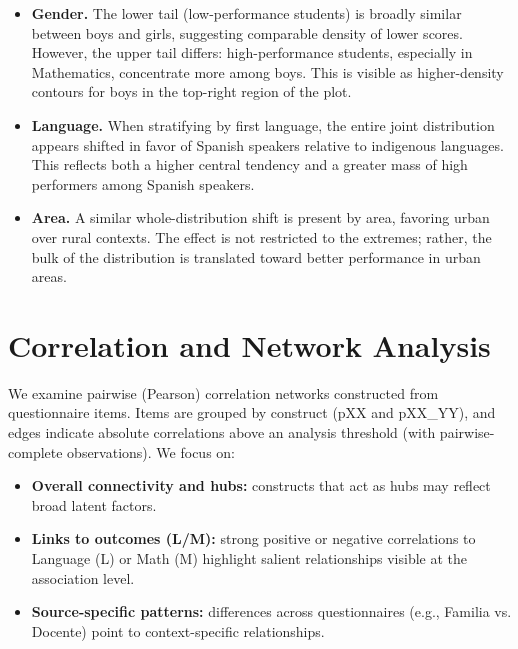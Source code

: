 \documentclass[11pt, a4paper]{article}
\begin{document}
\begin{itemize}
  \item \textbf{Gender.} The lower tail (low-performance students) is broadly similar between boys and girls, suggesting comparable density of lower scores. However, the upper tail differs: high-performance students, especially in Mathematics, concentrate more among boys. This is visible as higher-density contours for boys in the top-right region of the plot.
  \item \textbf{Language.} When stratifying by first language, the entire joint distribution appears shifted in favor of Spanish speakers relative to indigenous languages. This reflects both a higher central tendency and a greater mass of high performers among Spanish speakers.
  \item \textbf{Area.} A similar whole-distribution shift is present by area, favoring urban over rural contexts. The effect is not restricted to the extremes; rather, the bulk of the distribution is translated toward better performance in urban areas.
\end{itemize}


\clearpage

\section{Correlation and Network Analysis}
We examine pairwise (Pearson) correlation networks constructed from questionnaire items. Items are grouped by construct (pXX and pXX\_YY), and edges indicate absolute correlations above an analysis threshold (with pairwise-complete observations). We focus on:
\begin{itemize}
  \item \textbf{Overall connectivity and hubs:} constructs that act as hubs may reflect broad latent factors.
  \item \textbf{Links to outcomes (L/M):} strong positive or negative correlations to Language (L) or Math (M) highlight salient relationships visible at the association level.
  \item \textbf{Source-specific patterns:} differences across questionnaires (e.g., Familia vs. Docente) point to context-specific relationships.
\end{itemize}
\end{document}
